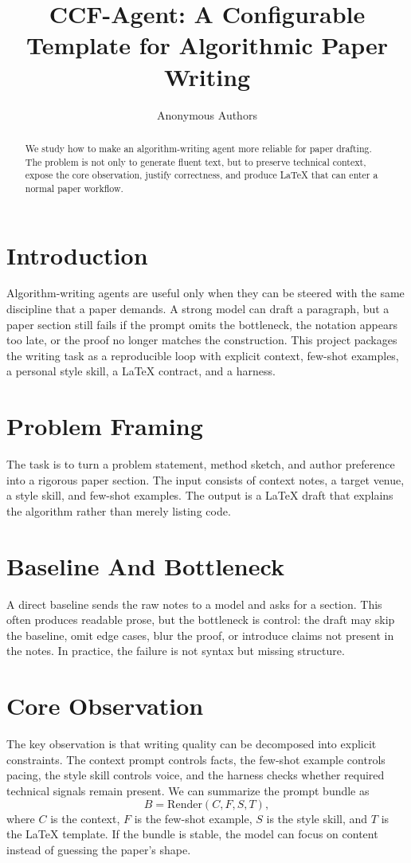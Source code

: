 \documentclass[11pt]{article}
\title{CCF-Agent: A Configurable Template for Algorithmic Paper Writing}
\author{Anonymous Authors}
\begin{document}
\maketitle

\begin{abstract}
We study how to make an algorithm-writing agent more reliable for paper drafting. The problem is not only to generate fluent text, but to preserve technical context, expose the core observation, justify correctness, and produce LaTeX that can enter a normal paper workflow.
\end{abstract}

\section{Introduction}
Algorithm-writing agents are useful only when they can be steered with the same discipline that a paper demands. A strong model can draft a paragraph, but a paper section still fails if the prompt omits the bottleneck, the notation appears too late, or the proof no longer matches the construction. This project packages the writing task as a reproducible loop with explicit context, few-shot examples, a personal style skill, a LaTeX contract, and a harness.

\section{Problem Framing}
The task is to turn a problem statement, method sketch, and author preference into a rigorous paper section. The input consists of context notes, a target venue, a style skill, and few-shot examples. The output is a LaTeX draft that explains the algorithm rather than merely listing code.

\section{Baseline And Bottleneck}
A direct baseline sends the raw notes to a model and asks for a section. This often produces readable prose, but the bottleneck is control: the draft may skip the baseline, omit edge cases, blur the proof, or introduce claims not present in the notes. In practice, the failure is not syntax but missing structure.

\section{Core Observation}
The key observation is that writing quality can be decomposed into explicit constraints. The context prompt controls facts, the few-shot example controls pacing, the style skill controls voice, and the harness checks whether required technical signals remain present. We can summarize the prompt bundle as
\begin{equation}\label{eq:bundle}
B = \mathrm{Render}(C, F, S, T),
\end{equation}
where $C$ is the context, $F$ is the few-shot example, $S$ is the style skill, and $T$ is the LaTeX template. If the bundle is stable, the model can focus on content instead of guessing the paper's shape.
\end{document}

